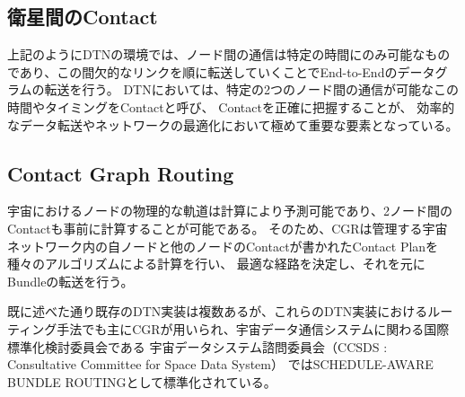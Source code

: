 \subsection{衛星間のContact}
\label{subsection:衛星間のContact}
上記のようにDTNの環境では、ノード間の通信は特定の時間にのみ可能なものであり、この間欠的なリンクを順に転送していくことでEnd-to-Endのデータグラムの転送を行う。
DTNにおいては、特定の2つのノード間の通信が可能なこの時間やタイミングをContactと呼び、
Contactを正確に把握することが、 効率的なデータ転送やネットワークの最適化において極めて重要な要素となっている。


\subsection{Contact Graph Routing}
\label{subsection:Contact Graph Routing}
宇宙におけるノードの物理的な軌道は計算により予測可能であり、2ノード間のContactも事前に計算することが可能である。 
そのため、CGRは管理する宇宙ネットワーク内の自ノードと他のノードのContactが書かれたContact Planを種々のアルゴリズムによる計算を行い、
最適な経路を決定し、それを元にBundleの転送を行う。

既に述べた通り既存のDTN実装は複数あるが、これらのDTN実装におけるルーティング手法でも主にCGRが用いられ、宇宙データ通信システムに関わる国際標準化検討委員会である
宇宙データシステム諮問委員会（CCSDS : Consultative Committee for Space Data System）
ではSCHEDULE-AWARE BUNDLE ROUTING\cite{schedule_aware_bundle_routing}として標準化されている。

